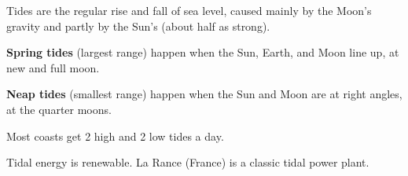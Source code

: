 \begin{gradebody}
\kf
\begin{keyfacts}
\item Tides are the regular rise and fall of sea level, caused mainly by the Moon's gravity and partly by the Sun's (about half as strong).
\item \textbf{Spring tides} (largest range) happen when the Sun, Earth, and Moon line up, at new and full moon.
\item \textbf{Neap tides} (smallest range) happen when the Sun and Moon are at right angles, at the quarter moons.
\item Most coasts get 2 high and 2 low tides a day.
\item Tidal energy is renewable. La Rance (France) is a classic tidal power plant.
\end{keyfacts}
\cards
{}
\begin{confbox}
\end{confbox}


\end{gradebody}
